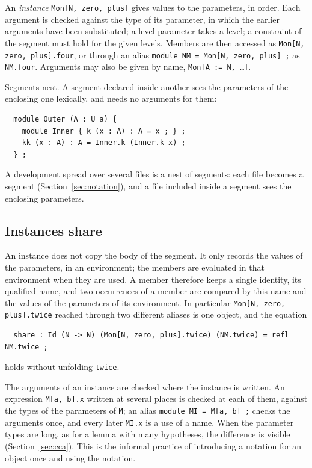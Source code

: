\documentclass[11pt]{article}
\newcommand{\kw}[1]{\texttt{#1}}
\theoremstyle{remark}
\begin{document}
An \emph{instance} \kw{Mon[N, zero, plus]} gives values to the parameters,
in order. Each argument is checked against the type of its parameter, in
which the earlier arguments have been substituted; a level parameter
takes a level; a constraint of the segment must hold for the given
levels. Members are then accessed as \kw{Mon[N, zero, plus].four}, or
through an alias \kw{module NM = Mon[N, zero, plus] ;} as \kw{NM.four}. Arguments may also be
given by name, \kw{Mon[A := N, \dots]}.

Segments nest. A segment declared inside another sees the parameters of
the enclosing one lexically, and needs no arguments for them:
\begin{verbatim}
  module Outer (A : U a) {
    module Inner { k (x : A) : A = x ; } ;
    kk (x : A) : A = Inner.k (Inner.k x) ;
  } ;
\end{verbatim}
A development spread over several files is a nest of segments: each file
becomes a segment (Section~\ref{sec:notation}), and a file included inside
a segment sees the enclosing parameters.

\subsection{Instances share}

An instance does not copy the body of the segment. It only records the
values of the parameters, in an environment; the members are evaluated
in that environment when they are used. A member therefore keeps a single
identity, its qualified name, and two occurrences of a member are
compared by this name and the values of the parameters of its
environment. In particular \kw{Mon[N, zero, plus].twice} reached through two
different aliases is one object, and the
equation
\begin{verbatim}
  share : Id (N -> N) (Mon[N, zero, plus].twice) (NM.twice) = refl NM.twice ;
\end{verbatim}
holds without unfolding \kw{twice}.

The arguments of an instance are checked where the instance is written.
An expression \kw{M[a, b].x} written at several places is checked at
each of them, against the types of the parameters of \kw{M}; an alias
\kw{module MI = M[a, b] ;} checks the arguments once, and every later
\kw{MI.x} is a use of a name. When the parameter types are long, as for
a lemma with many hypotheses, the difference is visible
(Section~\ref{sec:cca}). This is the informal practice of introducing a
notation for an object once and using the notation.
\end{document}
